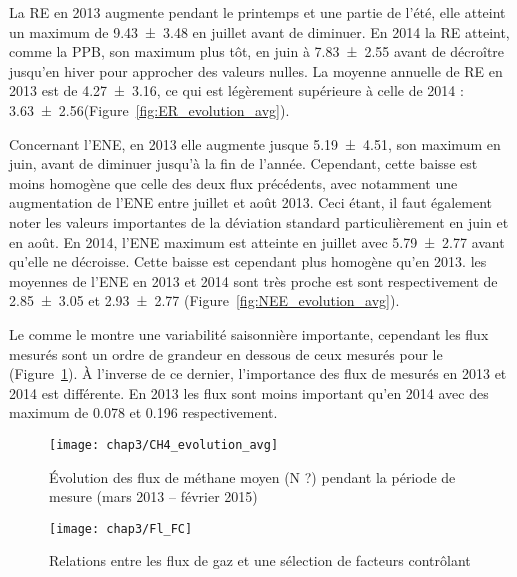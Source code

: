 La RE en 2013 augmente pendant le printemps et une partie de l'été, elle atteint un maximum de \SI{9.43(348)}{\uml} en juillet avant de diminuer.
En 2014 la RE atteint, comme la PPB, son maximum plus tôt, en juin à \SI{7.83(255)}{\uml} avant de décroître jusqu'en hiver pour approcher des valeurs nulles.
La moyenne annuelle de RE en 2013 est de \SI{4.27(316)}{\uml}, ce qui est légèrement supérieure à celle de 2014 : \SI{3.63(256)}{\uml}(Figure~\ref{fig:ER_evolution_avg}).

Concernant l'ENE, en 2013 elle augmente jusque \SI{5.19(451)}{\uml}, son maximum en juin, avant de diminuer jusqu'à la fin de l'année.
Cependant, cette baisse est moins homogène que celle des deux flux précédents, avec notamment une augmentation de l'ENE entre juillet et août 2013.
Ceci étant, il faut également noter les valeurs importantes de la déviation standard particulièrement en juin et en août.
En 2014, l'ENE maximum est atteinte en juillet avec \SI{5.79(277)}{\uml} avant qu'elle ne décroisse.
Cette baisse est cependant plus homogène qu'en 2013.
les moyennes de l'ENE en 2013 et 2014 sont très proche est sont respectivement de \SI{2.85(305)}{\uml} et \SI{2.93(277)}{\uml} (Figure~\ref{fig:NEE_evolution_avg}).


Le \chh comme le \coo montre une variabilité saisonnière importante, cependant les flux mesurés sont un ordre de grandeur en dessous de ceux mesurés pour le \coo (Figure~\ref{fig:CH4_evolution_avg}).
À l'inverse de ce dernier, l'importance des flux de \chh mesurés en 2013 et 2014 est différente.
En 2013 les flux sont moins important qu'en 2014 avec des maximum de \num{0.078} et \SI{0.196}{\uml} respectivement.

\begin{figure}
\centering
\texttt{[image: chap3/CH4\_evolution\_avg]}
\caption{Évolution des flux de méthane moyen (N ?) pendant la période de mesure (mars 2013 -- février 2015)}
\label{fig:CH4_evolution_avg}
\end{figure}

\begin{figure}
\centering
\texttt{[image: chap3/Fl\_FC]}
\caption{Relations entre les flux de gaz et une sélection de facteurs contrôlant}
\label{fig:Fl_FC}
\end{figure}

